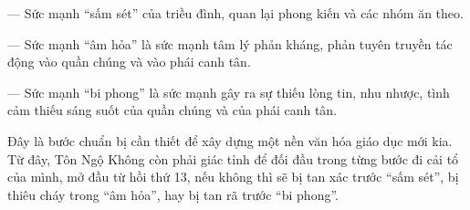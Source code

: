 — Sức mạnh ``sấm sét'' của triều đình, quan lại phong kiến và các nhóm ăn theo.

— Sức mạnh ``âm hỏa'' là sức mạnh tâm lý phản kháng, phản tuyên truyền tác động vào quần chúng và vào phái canh tân.

— Sức mạnh ``bi phong'' là sức mạnh gây ra sự thiếu lòng tin, nhu nhược, tình cảm thiếu sáng suốt của quần chúng và của phái canh tân.

Đây là bước chuẩn bị cần thiết để xây dựng một nền văn hóa giáo dục mới kia. Từ đây, Tôn Ngộ Không còn phải giác tỉnh để đối đầu trong từng bước đi cải tổ của mình, mở đầu từ hồi thứ 13, nếu không thì sẽ bị tan xác trước ``sấm sét'', bị thiêu cháy trong ``âm hỏa'', hay bị tan rã trước ``bi phong''.

